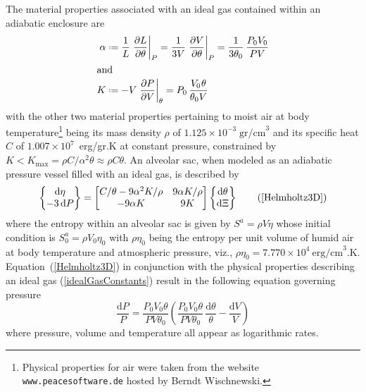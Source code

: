 The material properties associated with an ideal gas contained within an adiabatic enclosure are
\begin{subequations}
    \label{idealGasConstants}
    \begin{align}
\alpha & \defeq \frac{1}{L} \left. \frac{\partial L}{\partial \theta} \right|_P =
\frac{1}{3V} \left. \frac{\partial V}{\partial \theta} \right|_P = 
\frac{1}{3\theta_0} \, \frac{P_0 V_0}{P V} \\
\intertext{and}
K & \defeq -V \left. \frac{\partial P}{\partial V} \right|_{\theta} = 
P_0 \, \frac{V_0 \hspace{0.5pt} \theta}{\theta_0 V}
\end{align}
\end{subequations}
with the other two material properties pertaining to moist air at body temperature\footnote{
    Physical properties for air were taken from the website \texttt{www.peacesoftware.de} hosted by Berndt Wischnewski.
}
being its mass density $\rho$ of $1.125 \times 10^{-3} \; \text{gr/cm}^3$ and its specific heat $C$ of $1.007 \times 10^7$~erg/gr.K at constant pressure, constrained by $K < K_{\max} = \rho C / \alpha^2 \theta \approx \rho C \theta$.  An alveolar sac, when modeled as an adiabatic pressure vessel filled with an ideal gas, is described by
\begin{equation}
\left\{ \begin{matrix}
    \mathrm{d} \eta \\ -3 \, \mathrm{d} P
\end{matrix} \right\} = \begin{bmatrix}
    C / \theta - 9 \alpha^2 K / \rho & 
    9 \alpha K / \rho \\
    -9 \alpha K & 9 K
\end{bmatrix} \left\{ \begin{matrix}
    \mathrm{d} \theta \\ \mathrm{d} \Xi
\end{matrix} \right\}
\tag{\ref{Helmholtz3D}}
\end{equation}
where the entropy within an alveolar sac is given by $S^a = \rho V \eta$ whose initial condition is $S^a_0 = \rho V_0 \eta_0$ with $\rho \eta_0$ being the entropy per unit volume of humid air at body temperature and atmospheric pressure, viz., $\rho \eta_0 = 7.770 \times 10^4 \: \text{erg/cm}^3\text{.K}$.  Equation~(\ref{Helmholtz3D}) in conjunction with the physical properties describing an ideal gas (\ref{idealGasConstants}) result in the following equation governing pressure
\begin{displaymath}
\frac{\mathrm{d} P}{P} = \frac{P_0 V_0 \theta}{P V \theta_0} \left( 
\frac{P_0 V_0 \theta}{P V \theta_0} \, \frac{\mathrm{d} \theta}{\theta} - 
\frac{\mathrm{d} V}{V} \right)
\end{displaymath}
where pressure, volume and temperature all appear as logarithmic rates.

